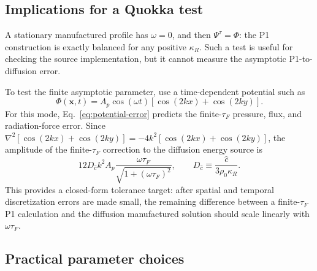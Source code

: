 \documentclass[11pt]{article}
\newcommand{\chat}{\hat{c}}
\begin{document}
\subsection{Implications for a Quokka test}

A stationary manufactured profile has \(\omega=0\), and then
\(\Psi^\tau=\Phi\): the P1 construction is exactly balanced for any positive
\(\kappa_R\).  Such a test is useful for checking the source implementation,
but it cannot measure the asymptotic P1-to-diffusion error.

To test the finite asymptotic parameter, use a time-dependent potential such
as
\begin{equation}
  \Phi(\bm{x},t)
  =
  A_p \cos(\omega t)
  \left[\cos(2kx)+\cos(2ky)\right].
  \label{eq:test-harmonic-potential}
\end{equation}
For this mode, Eq.~\eqref{eq:potential-error} predicts the finite-\(\tau_F\)
pressure, flux, and radiation-force error.  Since
\(\nabla^2[\cos(2kx)+\cos(2ky)]=-4k^2[\cos(2kx)+\cos(2ky)]\), the amplitude of
the finite-\(\tau_F\) correction to the diffusion energy source is
\begin{equation}
  12D_{\chat}k^2A_p
  \frac{\omega\tau_F}{\sqrt{1+(\omega\tau_F)^2}},
  \qquad
  D_{\chat}\equiv\frac{\chat}{3\rho_0\kappa_R}.
  \label{eq:source-error-amplitude}
\end{equation}
This provides a closed-form tolerance target: after spatial and temporal
discretization errors are made small, the remaining difference between a
finite-\(\tau_F\) P1 calculation and the diffusion manufactured solution should
scale linearly with \(\omega\tau_F\).

\subsection{Practical parameter choices}
\end{document}
